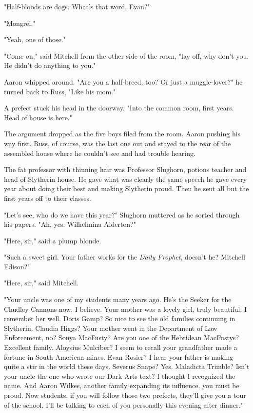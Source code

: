 "Half-bloods are dogs. What's that word, Evan?"

"Mongrel."

"Yeah, one of those."

"Come on," said Mitchell from the other side of the room, "lay off, why don't you. He didn't do anything to you."

Aaron whipped around. "Are you a half-breed, too? Or just a muggle-lover?" he turned back to Russ, "Like his mom."

A prefect stuck his head in the doorway. "Into the common room, first years. Head of house is here."

The argument dropped as the five boys filed from the room, Aaron pushing his way first. Russ, of course, was the last one out and stayed to the rear of the assembled house where he couldn't see and had trouble hearing.

The fat professor with thinning hair was Professor Slughorn, potions teacher and head of Slytherin house. He gave what was clearly the same speech he gave every year about doing their best and making Slytherin proud. Then he sent all but the first years off to their classes.

"Let's see, who do we have this year?" Slughorn muttered as he sorted through his papers. "Ah, yes. Wilhelmina Alderton?"

"Here, sir," said a plump blonde.

"Such a sweet girl. Your father works for the \emph{Daily Prophet}, doesn't he? Mitchell Edison?"

"Here, sir," said Mitchell.

"Your uncle was one of my students many years ago. He's the Seeker for the Chudley Cannons now, I believe. Your mother was a lovely girl, truly beautiful. I remember her well. Doris Gamp? So nice to see the old families continuing in Slytherin. Claudia Higgs? Your mother went in the Department of Law Enforcement, no? Sonya MacFusty? Are you one of the Hebridean MacFustys? Excellent family. Aloysius Mulciber? I seem to recall your grandfather made a fortune in South American mines. Evan Rosier? I hear your father is making quite a stir in the world these days. Severus Snape? Yes. Maladicta Trimble? Isn't your uncle the one who wrote our Dark Arts text? I thought I recognized the name. And Aaron Wilkes, another family expanding its influence, you must be proud. Now students, if you will follow those two prefects, they'll give you a tour of the school. I'll be talking to each of you personally this evening after dinner."

